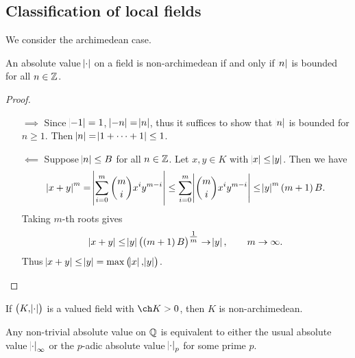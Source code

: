 \subsection{Classification of local fields}

We consider the archimedean case.

\begin{lemma}
\label{lem:9.3}
An absolute value $ \abs{\cdot} $ on a field is non-archimedean if and only if $ \abs{n} $ is bounded for all $ n \in \mathbb{Z} $.
\end{lemma}

\begin{proof}
\hfill
\begin{itemize}
\item[$ \implies $] Since $ \abs{-1} = 1 $, $ \abs{-n} = \abs{n} $, thus it suffices to show that $ \abs{n} $ is bounded for $ n \ge 1 $. Then $ \abs{n} = \abs{1 + \dots + 1} \le 1 $.
\item[$ \impliedby $] Suppose $ \abs{n} \le B $ for all $ n \in \mathbb{Z} $. Let $ x, y \in K $ with $ \abs{x} \le \abs{y} $. Then we have
$$ \abs{x + y}^m = \abs{\sum_{i = 0}^m \binom{m}{i}x^iy^{m - i}} \le \sum_{i = 0}^m \abs{\binom{m}{i}x^iy^{m - i}} \le \abs{y}^m\br{m + 1}B. $$
Taking $ m $-th roots gives
$$ \abs{x + y} \le \abs{y}\br{\br{m + 1}B}^{\tfrac{1}{m}} \to \abs{y}, \qquad m \to \infty. $$
Thus $ \abs{x + y} \le \abs{y} = \max\br{\abs{x}, \abs{y}} $.
\end{itemize}
\end{proof}

\begin{corollary}
\label{cor:9.4}
If $ \br{K, \abs{\cdot}} $ is a valued field with $ \ch K > 0 $, then $ K $ is non-archimedean.
\end{corollary}

\begin{theorem}
Any non-trivial absolute value on $ \mathbb{Q} $ is equivalent to either the usual absolute value $ \abs{\cdot}_\infty $ or the $ p $-adic absolute value $ \abs{\cdot}_p $ for some prime $ p $.
\end{theorem}

